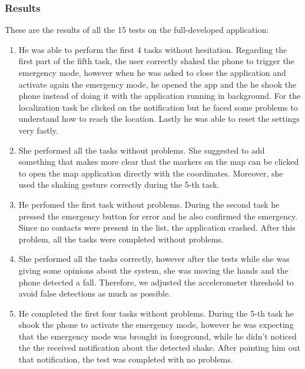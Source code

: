\documentclass[12pt]{article}
\begin{document}
\subsubsection{Results}
These are the results of all the 15 tests on the full-developed application:
\begin{enumerate}
    \item He was able to perform the first 4 tasks without hesitation. 
    Regarding the first part of the fifth task, the user correctly shaked 
    the phone to trigger the emergency mode, however when he was asked to 
    close the application and activate again the emergency mode, he opened 
    the app and the he shook the phone instead of doing it with the 
    application running in background. For the localization task he clicked on the 
    notification but he faced some problems to understand how to reach the 
    location. Lastly he was able to reset the settings very fastly. 

    \item She performed all the tasks without problems. She suggested to 
    add something that makes more clear that the markers on the map can 
    be clicked to open the map application directly with the coordinates. 
    Moreover, she used the shaking gesture correctly during the 5-th task.

    \item He perfomed the first task without problems. During the second 
    task he pressed the emergency button for error and he also confirmed 
    the emergency. Since no contacts were present in the list, the application 
    crashed. After this problem, all the tasks were completed without problems. 

    \item She performed all the tasks correctly, however after the tests 
    while she was giving some opinions about the system, she was moving the 
    hands and the phone detected a fall. Therefore, we adjusted the 
    accelerometer threshold to avoid false detections as much as possible.  

    \item He completed the first four tasks without problems. During the 5-th task 
    he shook the phone to activate the emergency mode, however he was expecting that 
    the emergency mode was brought in foreground, while he didn't noticed the 
    the received notification about the detected shake. After pointing him out that 
    notification, the test was completed with no problems.


\end{enumerate}
\end{document}
